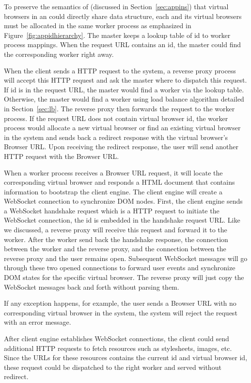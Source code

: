 To preserve the semantics of \appins (discussed in Section~\ref{sec:appins})
that virtual browsers in an \appins could directly share data structure, each
\appins and its virtual browsers must be allocated in the same worker process
as emphasized in Figure~\ref{fig:appidhierarchy}. The master keeps a lookup
table of \appins id to worker process mappings.  When the request URL contains
an \appins id,  the master could find the corresponding worker right away.

When the client sends a HTTP request to the system, a reverse proxy process
will accept this HTTP request and ask the master where to dispatch this
request. If \appins id is in the request URL, the master would find a worker
via the lookup table. Otherwise, the master would find a worker using load
balance algorithm detailed in Section~\ref{sec:lb}. The reverse proxy then
forwards the request to the worker process. If the request URL does not
contain virtual browser id, the worker process would allocate a new virtual
browser or find an existing virtual browser in the system and sends back a
redirect response with the virtual browser's Browser URL. Upon receiving the
redirect response, the user will send another HTTP request with the Browser
URL.

When a worker process receives a Browser URL request, it will locate the
corresponding virtual browser and responds a HTML document that contains
information to bootstrap the client engine. The client engine will create a
WebSocket connection to synchronize DOM nodes. First, the client engine sends
a WebSocket handshake request which is a HTTP request to initiate the
WebSocket connection, the \appins id is embedded in the handshake request URL.
Like we discussed, a reverse proxy will receive this request and forward it to
the worker. After the worker send back the handshake response, the connection
between the worker and the reverse proxy, and the connection between the
reverse proxy and the user remains open. Subsequent WebSocket messages will go
through these two opened connections to forward user events and synchronize
DOM states for the specific virtual browser. The reverse proxy will just copy
the WebSocket messages back and forth without parsing them.

If any exception happens, for example, the user sends a Browser URL with no
corresponding virtual browser in the system, the system will reject the
request with an error message.

After client engine establishes WebSocket connections, the client could send
additional HTTP requests to fetch resources such as stylesheets, images, etc.
Since the URLs for these resources contains the current \appins id and virtual
browser id, these request could be dispatched to the right worker and  served
without redirect.

